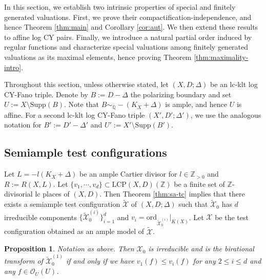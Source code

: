 \documentclass[reqno, 12pt]{amsart}
\newtheorem{prop}{Proposition}[section]
\theoremstyle{definition}
\newcommand{\bQ}{\mathbb{Q}}
\newcommand{\bZ}{\mathbb{Z}}
\newcommand{\cX}{\mathcal{X}}
\newcommand{\cO}{\mathcal{O}}
\newcommand{\Supp}{\mathrm{Supp}}
\newcommand{\ord}{\mathrm{ord}}
\newcommand{\tcX}{\widetilde{\mathcal{X}}}
\newcommand{\LCP}{\mathrm{LCP}}
\numberwithin{equation}{section}
\begin{document}
In this section, we establish two intrinsic properties of special and finitely
generated valuations. First, we prove their compactification-independence,
and hence Theorem \ref{thm:main} and Corollary \ref{cor:aut}. We then extend these results to affine log CY pairs. Finally, we introduce a natural partial order induced by
regular functions and characterize special valuations among finitely generated
valuations as its maximal elements, hence proving Theorem \ref{thm:maximality-intro}.

Throughout this section, unless otherwise stated, let $(X,D;\Delta)$  be an lc-klt log CY-Fano triple. Denote by $B:=D-\Delta$ the polarizing boundary and set $U:= X\setminus \Supp(B)$. Note that $B\sim_{\bQ}-(K_X+\Delta)$ is ample, and hence $U$ is affine.
For a second lc-klt log CY-Fano triple $(X',D';\Delta')$, we use the analogous notation for $B':=D'-\Delta'$ and $U':= X'\setminus \Supp(B')$.


\subsection{Semiample test configurations}

Let $L= -l(K_X+\Delta)$ be an ample Cartier divisor for $l\in \bZ_{>0}$ and $R:= R(X,L)$. Let $\{v_1,\cdots, v_d\}\subset \LCP(X,D)(\bZ)$ be a finite set of $\bZ$-divisorial lc places of $(X,D)$. Then Theorem \ref{thm:sa-tc} implies that there exists a semiample test configuration $\tcX$ of $(X,D;\Delta)$ such that $\tcX_0$ has $d$ irreducible components $\{\tcX_0^{(i)}\}_{i=1}^d$ and $v_i = \ord_{\tcX_0^{(i)}}|_{K(X)}$. Let $\cX$ be the test configuration obtained as an ample model of $\tcX$. 

\begin{prop}\label{prop:sa-tc-integral}
Notation as above. Then $\cX_0$ is irreducible and is the birational transform of $\tcX_0^{(1)}$ if and only if we have $v_1(f) \leq v_i(f)$ for any $2\leq i\leq d$ and any $f\in \cO_U(U)$.
\end{prop}
\end{document}
